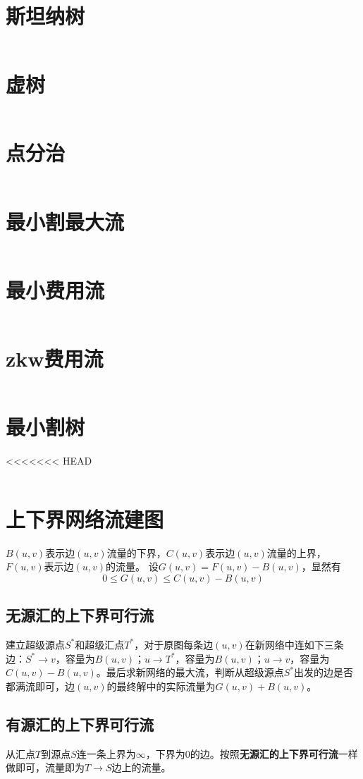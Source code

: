 \section{斯坦纳树}
\inputminted{cpp}{\source/graph-theory/Steiner-Tree.cpp}
\section{虚树}
\inputminted{cpp}{\source/graph-theory/mirage-tree.cpp}
\section{点分治}
\inputminted{cpp}{\source/graph-theory/vertex-partition.cpp}
\section{最小割最大流}
\inputminted{cpp}{\source/graph-theory/dinic.cpp}
\section{最小费用流}
\inputminted{cpp}{\source/graph-theory/mincost-maxflow.cpp}
\section{zkw费用流}
\inputminted{cpp}{\source/graph-theory/zkw-cost-flow.cpp}
\section{最小割树}
<<<<<<< HEAD
\inputminted{cpp}{\source/graph-theory/GH-tree.cpp}
\section{上下界网络流建图}
$B(u,v)$表示边$(u,v)$流量的下界，$C(u,v)$表示边$(u,v)$流量的上界，$F(u,v)$表示边$(u,v)$的流量。
设$G(u,v) = F(u,v) - B(u,v)$，显然有
$$0 \leq G(u,v) \leq C(u,v)-B(u,v)$$
\subsection{无源汇的上下界可行流}
建立超级源点$S^*$和超级汇点$T^*$，对于原图每条边$(u,v)$在新网络中连如下三条边：$S^* \rightarrow v$，容量为$B(u,v)$；$u \rightarrow T^*$，容量为$B(u,v)$；$u \rightarrow v$，容量为$C(u,v) - B(u,v)$。最后求新网络的最大流，判断从超级源点$S^*$出发的边是否都满流即可，边$(u,v)$的最终解中的实际流量为$G(u,v)+B(u,v)$。
\subsection{有源汇的上下界可行流}
从汇点$T$到源点$S$连一条上界为$\infty$，下界为$0$的边。按照\textbf{无源汇的上下界可行流}一样做即可，流量即为$T \rightarrow S$边上的流量。
